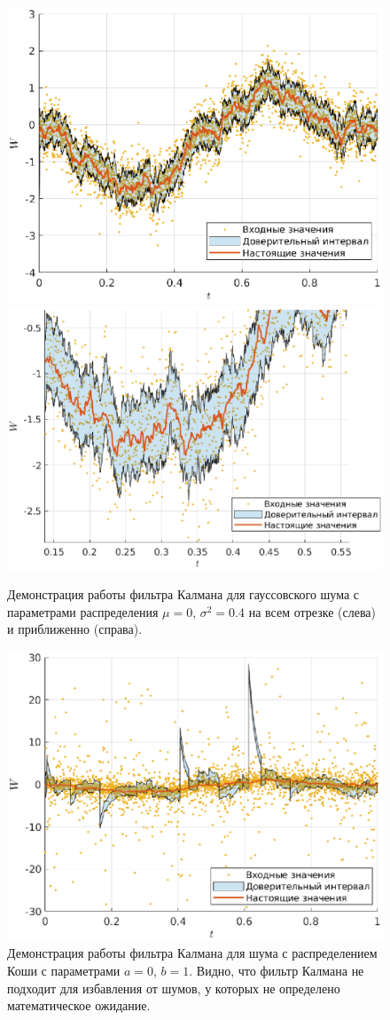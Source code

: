 \clearpage
\begin{figure}[t]
        \includegraphics[width=0.5\linewidth]{task_10/n_big.eps}
        \includegraphics[width=0.5\linewidth]{task_10/n_small.eps}
        \caption{Демонстрация работы фильтра Калмана для гауссовского шума с параметрами распределения $\mu = 0$, $\sigma^2 = 0.4$ на всем отрезке (слева) и приближенно (справа).}
\end{figure}
\begin{figure}[b]
        \includegraphics[width=\linewidth]{task_10/c.eps}
        \caption{Демонстрация работы фильтра Калмана для шума с распределением Коши с параметрами $a = 0$, $b = 1$. Видно, что фильтр Калмана не подходит для избавления от шумов, у которых не определено математическое ожидание.}
\end{figure}